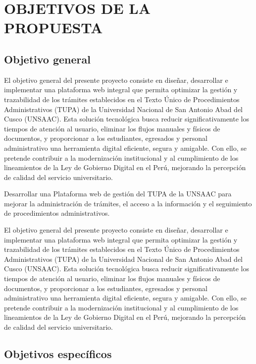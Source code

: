 \newpage
\chapter{OBJETIVOS DE LA PROPUESTA}

\section{Objetivo general}



El objetivo general del presente proyecto consiste en diseñar, desarrollar e implementar una plataforma 
web integral que permita optimizar la gestión y trazabilidad de los trámites establecidos en el Texto Único 
de Procedimientos Administrativos (TUPA) de la Universidad Nacional de San Antonio Abad del Cusco (UNSAAC). 
Esta solución tecnológica busca reducir significativamente los tiempos de atención al usuario, eliminar los 
flujos manuales y físicos de documentos, y proporcionar a los estudiantes, egresados y personal administrativo 
una herramienta digital eficiente, segura y amigable. Con ello, se pretende contribuir a la modernización 
institucional y al cumplimiento de los lineamientos de la Ley de Gobierno Digital en el Perú, mejorando la 
percepción de calidad del servicio universitario.

Desarrollar una Plataforma web de gestión del TUPA de la UNSAAC para mejorar la administración de trámites, el acceso a la información y el seguimiento de procedimientos administrativos.


El objetivo general del presente proyecto consiste en diseñar, desarrollar e implementar una plataforma web integral 
que permita optimizar la gestión y trazabilidad de los trámites establecidos en el Texto Único de Procedimientos 
Administrativos (TUPA) de la Universidad Nacional de San Antonio Abad del Cusco (UNSAAC). Esta solución tecnológica 
busca reducir significativamente los tiempos de atención al usuario, eliminar los flujos manuales y físicos de 
documentos, y proporcionar a los estudiantes, egresados y personal administrativo una herramienta digital eficiente, 
segura y amigable. Con ello, se pretende contribuir a la modernización institucional y al cumplimiento de los lineamientos 
de la Ley de Gobierno Digital en el Perú, mejorando la percepción de calidad del servicio universitario.


\section{Objetivos específicos}

